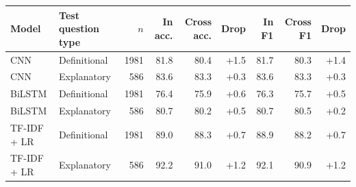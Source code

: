 \begin{tabular}{llrrrrrrr}
\toprule
Model & Test question type & $n$ & In acc. & Cross acc. & Drop & In F1 & Cross F1 & Drop \\
\midrule
CNN & Definitional & 1981 & 81.8 & 80.4 & +1.5 & 81.7 & 80.3 & +1.4 \\
CNN & Explanatory & 586 & 83.6 & 83.3 & +0.3 & 83.6 & 83.3 & +0.3 \\
\midrule
BiLSTM & Definitional & 1981 & 76.4 & 75.9 & +0.6 & 76.3 & 75.7 & +0.5 \\
BiLSTM & Explanatory & 586 & 80.7 & 80.2 & +0.5 & 80.7 & 80.5 & +0.2 \\
\midrule
TF-IDF + LR & Definitional & 1981 & 89.0 & 88.3 & +0.7 & 88.9 & 88.2 & +0.7 \\
TF-IDF + LR & Explanatory & 586 & 92.2 & 91.0 & +1.2 & 92.1 & 90.9 & +1.2 \\
\bottomrule
\end{tabular}
